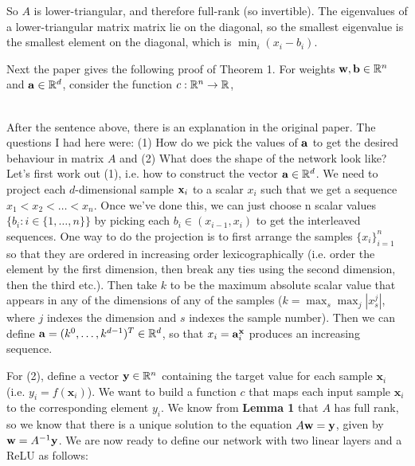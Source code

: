 So $A$ is lower-triangular, and therefore full-rank (so invertible).  The eigenvalues of a lower-triangular matrix matrix lie on the diagonal, so the smallest eigenvalue is the smallest element on the diagonal, which is $\min_i (x_i - b_i)$.

Next the paper gives the following proof of Theorem 1.  For weights $\mathbf{w}, \mathbf{b} \in \mathbb{R}^n$ and $\mathbf{a} \in \mathbb{R}^d$, consider the function $c: \mathbb{R}^n \to \mathbb{R}$, 


 \\

After the sentence above, there is an explanation in the original paper.  The questions I had here were: (1) How do we pick the values of $\mathbf{a}$ to get the desired behaviour in matrix $A$ and (2) What does the shape of the network look like? \\

Let's first work out (1), i.e. how to construct the vector $\mathbf{a} \in \mathbb{R}^d$. We need to project each $d$-dimensional sample $\mathbf{x}_i$ to a scalar $x_i$ such that we get a sequence $x_1 < x_2 < \dots < x_n$. Once we've done this, we can just choose n  scalar values $\{b_i: i \in \{1, \dots, n\}\}$ by picking each $b_i \in (x_{i-1}, x_i)$ to get the interleaved sequences.  One way to do the projection is to first arrange the samples $\{ x_i \}_{i=1}^n$ so that they are ordered in increasing order lexicographically (i.e. order the element by the first dimension, then break any ties using the second dimension, then the third etc.).  Then take $k$ to be the maximum absolute scalar value that appears in any of the dimensions of any of the samples ($k = \max_s \max_j |x_s^j|$, where $j$ indexes the dimension and $s$ indexes the sample number). Then we can define $\mathbf{a} = (k^0, \dots, k^{d-1})^T \in \mathbb{R}^d$, so that $x_i = \mathbf{a}^{\mathbf{x}}_i$ produces an increasing sequence.

For (2), define a vector $\mathbf{y} \in \mathbb{R}^n$ containing the target value for each sample $\mathbf{x}_i$ (i.e. $y_i = f(\mathbf{x}_i)$).  We want to build a function $c$ that maps each input sample $\mathbf{x}_i$ to the corresponding element $y_i$.  We know from \textbf{Lemma 1} that $A$ has full rank, so we know that there is a unique solution to the equation $A \mathbf{w} = \mathbf{y}$, given by $\mathbf{w} = A^{-1}\mathbf{y}$. We are now ready to define our network with two linear layers and a ReLU as follows:

